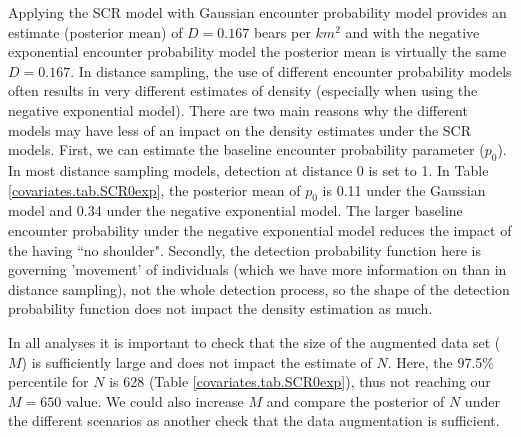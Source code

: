 Applying the SCR model with Gaussian encounter probability model
 provides an
estimate (posterior mean) of $D = 0.167$ bears per $km^2$ and with the
negative exponential encounter probability model
the posterior mean  is virtually the
same $D = 0.167$.  In distance sampling, the use of different
encounter probability models
 often results in very different estimates of density
(especially when using the negative exponential model).  There are
two main reasons why the different models  may have less of
an impact on the density estimates under the SCR models.  First, we
can estimate the baseline encounter probability
 parameter ($p_0$).  
In most
distance sampling models, detection at distance 0 is set to 1.  In
Table \ref{covariates.tab.SCR0exp}, the posterior mean of $p_0$ is
0.11 under the Gaussian  model and 0.34 under the negative
exponential model.  The larger baseline encounter probability
 under the negative
exponential model reduces the impact of the having ``no shoulder".
Secondly, the detection probability function here is governing 'movement' of
individuals (which we have more information on than in distance
sampling), not the whole detection process, so the shape of the
detection probability function does not impact the density estimation as much.

In all analyses it is important to check that the size of the
augmented data set ($M$) is sufficiently large and does not impact 
the estimate of $N$.  Here, the 97.5\%
percentile for $N$ is 628 (Table \ref{covariates.tab.SCR0exp}), thus not reaching our $M=650$ value.
We could also increase
$M$ and compare the posterior of $N$ under the different scenarios as another check 
that the data augmentation is sufficient.  

